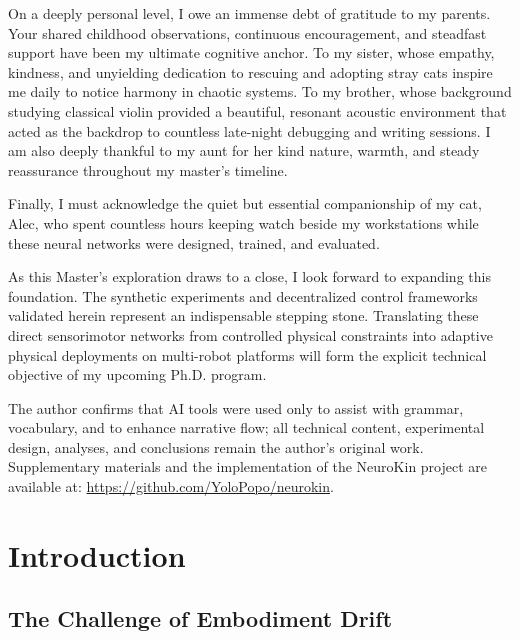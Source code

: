 \documentclass[12pt,a4paper,oneside]{report}
\begin{document}
On a deeply personal level, I owe an immense debt of gratitude to my parents. Your shared childhood observations, continuous encouragement, and steadfast support have been my ultimate cognitive anchor. To my sister, whose empathy, kindness, and unyielding dedication to rescuing and adopting stray cats inspire me daily to notice harmony in chaotic systems. To my brother, whose background studying classical violin provided a beautiful, resonant acoustic environment that acted as the backdrop to countless late-night debugging and writing sessions. I am also deeply thankful to my aunt for her kind nature, warmth, and steady reassurance throughout my master's timeline.

Finally, I must acknowledge the quiet but essential companionship of my cat, Alec, who spent countless hours keeping watch beside my workstations while these neural networks were designed, trained, and evaluated. 

As this Master's exploration draws to a close, I look forward to expanding this foundation. The synthetic experiments and decentralized control frameworks validated herein represent an indispensable stepping stone. Translating these direct sensorimotor networks from controlled physical constraints into adaptive physical deployments on multi-robot platforms will form the explicit technical objective of my upcoming Ph.D. program.

The author confirms that AI tools were used only to assist with grammar, vocabulary, and to enhance narrative flow; all technical content, experimental design, analyses, and conclusions remain the author's original work. Supplementary materials and the implementation of the NeuroKin project are available at: \url{https://github.com/YoloPopo/neurokin}.
\clearpage

\tableofcontents
\clearpage
\listoffigures
{}
\clearpage
\listoftables
{}
\clearpage


\chapter{Introduction}
\label{chap:intro}

\section{The Challenge of Embodiment Drift}
\label{sec:challenge_embodiment_drift}
\end{document}
